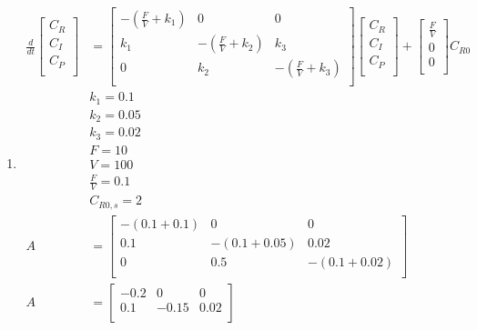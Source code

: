 \documentclass[12pt]{article}
\begin{document}
\begin{enumerate}
\begin{enumerate}
    \item 
    \begin{align*}
        \frac{d}{dt} \begin{bmatrix}
            C_R \\
            C_I \\
            C_P \\
        \end{bmatrix} &= \begin{bmatrix}
            -\left(\frac{F}{V} + k_1\right) & 0 & 0 \\
            k_1 & -\left(\frac{F}{V} + k_2\right) & k_3 \\
            0 & k_2 & -\left(\frac{F}{V} + k_3\right) \\
        \end{bmatrix} \begin{bmatrix}
            C_R \\
            C_I \\
            C_P \\
        \end{bmatrix} + \begin{bmatrix}
            \frac{F}{V} \\
            0 \\
            0 \\
        \end{bmatrix} C_{R0} \\
        & k_1 = 0.1 \\
        & k_2 = 0.05 \\
        & k_3 = 0.02 \\
        & F = 10 \\
        & V = 100 \\
        & \frac{F}{V} = 0.1 \\
        & C_{R0,s} = 2 \\
        A &= \begin{bmatrix}
            -\left(0.1 + 0.1\right) & 0 & 0 \\
            0.1 & -\left(0.1 + 0.05\right) & 0.02 \\
            0 & 0.5 & -\left(0.1 + 0.02\right) \\
        \end{bmatrix} \\
        A &= \begin{bmatrix}
            -0.2 & 0 & 0 \\
            0.1 & -0.15 & 0.02 \\

\end{bmatrix}
\end{align*}
\end{enumerate}
\end{enumerate}
\end{document}

